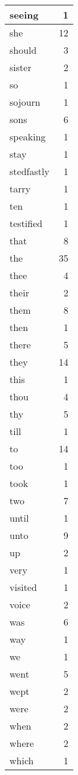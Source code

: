 \begin{center}
\begin{longtable}{l|r}
seeing & 1 \\ \hline
she & 12 \\ \hline
should & 3 \\ \hline
sister & 2 \\ \hline
so & 1 \\ \hline
sojourn & 1 \\ \hline
sons & 6 \\ \hline
speaking & 1 \\ \hline
stay & 1 \\ \hline
stedfastly & 1 \\ \hline
tarry & 1 \\ \hline
ten & 1 \\ \hline
testified & 1 \\ \hline
that & 8 \\ \hline
the & 35 \\ \hline
thee & 4 \\ \hline
their & 2 \\ \hline
them & 8 \\ \hline
then & 1 \\ \hline
there & 5 \\ \hline
they & 14 \\ \hline
this & 1 \\ \hline
thou & 4 \\ \hline
thy & 5 \\ \hline
till & 1 \\ \hline
to & 14 \\ \hline
too & 1 \\ \hline
took & 1 \\ \hline
two & 7 \\ \hline
until & 1 \\ \hline
unto & 9 \\ \hline
up & 2 \\ \hline
very & 1 \\ \hline
visited & 1 \\ \hline
voice & 2 \\ \hline
was & 6 \\ \hline
way & 1 \\ \hline
we & 1 \\ \hline
went & 5 \\ \hline
wept & 2 \\ \hline
were & 2 \\ \hline
when & 2 \\ \hline
where & 2 \\ \hline
which & 1 \\ \hline

\end{longtable}
\end{center}
